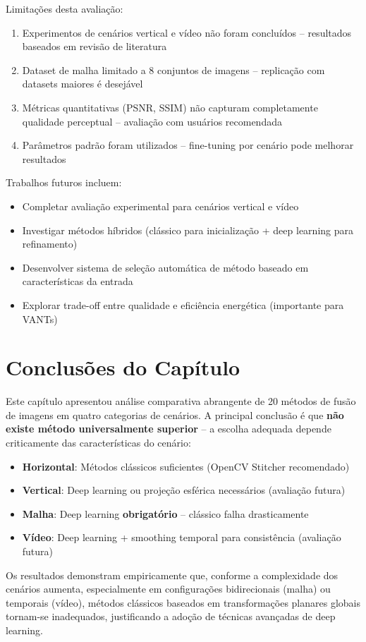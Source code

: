 Limitações desta avaliação:

\begin{enumerate}
    \item Experimentos de cenários vertical e vídeo não foram concluídos -- resultados baseados em revisão de literatura

    \item Dataset de malha limitado a 8 conjuntos de imagens -- replicação com datasets maiores é desejável

    \item Métricas quantitativas (PSNR, SSIM) não capturam completamente qualidade perceptual -- avaliação com usuários recomendada

    \item Parâmetros padrão foram utilizados -- fine-tuning por cenário pode melhorar resultados
\end{enumerate}

Trabalhos futuros incluem:

\begin{itemize}
    \item Completar avaliação experimental para cenários vertical e vídeo
    \item Investigar métodos híbridos (clássico para inicialização + deep learning para refinamento)
    \item Desenvolver sistema de seleção automática de método baseado em características da entrada
    \item Explorar trade-off entre qualidade e eficiência energética (importante para VANTs)
\end{itemize}

\section{Conclusões do Capítulo}

Este capítulo apresentou análise comparativa abrangente de 20 métodos de fusão de imagens em quatro categorias de cenários. A principal conclusão é que \textbf{não existe método universalmente superior} -- a escolha adequada depende criticamente das características do cenário:

\begin{itemize}
    \item \textbf{Horizontal}: Métodos clássicos suficientes (OpenCV Stitcher recomendado)
    \item \textbf{Vertical}: Deep learning ou projeção esférica necessários (avaliação futura)
    \item \textbf{Malha}: Deep learning \textbf{obrigatório} -- clássico falha drasticamente
    \item \textbf{Vídeo}: Deep learning + smoothing temporal para consistência (avaliação futura)
\end{itemize}

Os resultados demonstram empiricamente que, conforme a complexidade dos cenários aumenta, especialmente em configurações bidirecionais (malha) ou temporais (vídeo), métodos clássicos baseados em transformações planares globais tornam-se inadequados, justificando a adoção de técnicas avançadas de deep learning.
